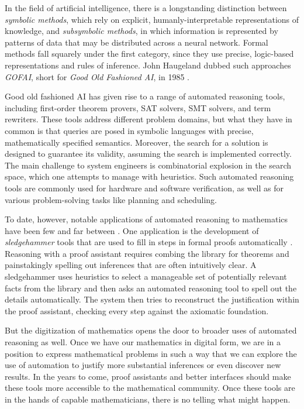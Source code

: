 \documentclass{amsart}
\theoremstyle{definition}
\theoremstyle{remark}
\numberwithin{equation}{section}
\begin{document}
In the field of artificial intelligence, there is a longstanding distinction between \emph{symbolic methods}, which rely on explicit, humanly-interpretable representations of knowledge, and \emph{subsymbolic methods}, in which information is represented by patterns of data that may be distributed across a neural network. Formal methods fall squarely under the first category, since they use precise, logic-based representations and rules of inference. John Haugeland dubbed such approaches \emph{GOFAI}, short for \emph{Good Old Fashioned AI}, in 1985 \cite{haugeland:85}.

Good old fashioned AI has given rise to a range of automated reasoning tools, including first-order theorem provers, SAT solvers, SMT solvers, and term rewriters. These tools address different problem domains, but what they have in common is that queries are posed in symbolic languages with precise, mathematically specified semantics. Moreover, the search for a solution is designed to guarantee its validity, assuming the search is implemented correctly. The main challenge to system engineers is combinatorial explosion in the search space, which one attempts to manage with heuristics. Such automated reasoning tools are commonly used for hardware and software verification, as well as for various problem-solving tasks like planning and scheduling.

To date, however, notable applications of automated reasoning to mathematics have been few and far between \cite{avigad:18,heule:kullmann:17}. One application is the development of \emph{sledgehammer} tools that are used to fill in steps in formal proofs automatically \cite{desharnais:et:al:22}. Reasoning with a proof assistant requires combing the library for theorems and painstakingly spelling out inferences that are often intuitively clear. A sledgehammer uses heuristics to select a manageable set of potentially relevant facts from the library and then asks an automated reasoning tool to spell out the details automatically. The system then tries to reconstruct the justification within the proof assistant, checking every step against the axiomatic foundation.

But the digitization of mathematics opens the door to broader uses of automated reasoning as well. Once we have our mathematics in digital form, we are in a position to express mathematical problems in such a way that we can explore the use of automation to justify more substantial inferences or even discover new results. In the years to come, proof assistants and better interfaces should make these tools more accessible to the mathematical community. Once these tools are in the hands of capable mathematicians, there is no telling what might happen.
\end{document}
